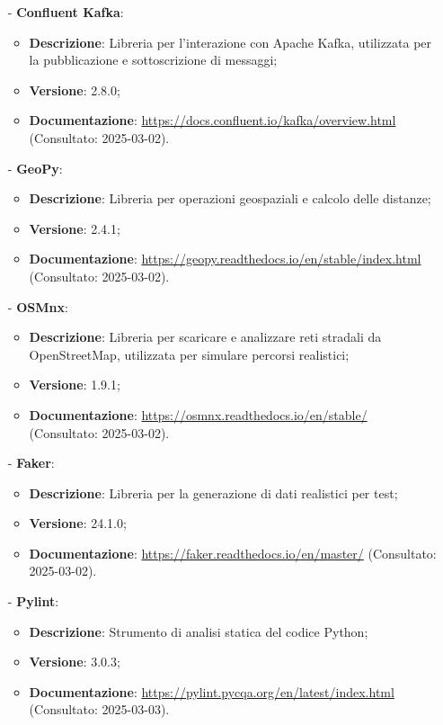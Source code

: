 \documentclass[10pt]{article}
\begin{document}
\begin{itemize}
    \item[-] \textbf{Confluent Kafka}:
    \begin{itemize}
        \item \textbf{Descrizione}: Libreria per l'interazione con Apache Kafka, utilizzata per la pubblicazione e sottoscrizione di messaggi;
        \item \textbf{Versione}: 2.8.0;
        \item \textbf{Documentazione}: \textcolor{blue}{\url{https://docs.confluent.io/kafka/overview.html}} (Consultato: 2025-03-02).
    \end{itemize}
    
    \item[-] \textbf{GeoPy}:
    \begin{itemize}
        \item \textbf{Descrizione}: Libreria per operazioni geospaziali e calcolo delle distanze;
        \item \textbf{Versione}: 2.4.1;
        \item \textbf{Documentazione}: \textcolor{blue}{\url{https://geopy.readthedocs.io/en/stable/index.html}} (Consultato: 2025-03-02).
    \end{itemize}
    
    \item[-] \textbf{OSMnx}:
    \begin{itemize}
        \item \textbf{Descrizione}: Libreria per scaricare e analizzare reti stradali da OpenStreetMap, utilizzata per simulare percorsi realistici;
        \item \textbf{Versione}: 1.9.1;
        \item \textbf{Documentazione}: \textcolor{blue}{\url{https://osmnx.readthedocs.io/en/stable/}} (Consultato: 2025-03-02).
    \end{itemize}
    
    \item[-] \textbf{Faker}:
    \begin{itemize}
        \item \textbf{Descrizione}: Libreria per la generazione di dati realistici per test;
        \item \textbf{Versione}: 24.1.0;
        \item \textbf{Documentazione}: \textcolor{blue}{\url{https://faker.readthedocs.io/en/master/}} (Consultato: 2025-03-02).
    \end{itemize}
    
    \item[-] \textbf{Pylint}:
    \begin{itemize}
        \item \textbf{Descrizione}: Strumento di analisi statica del codice Python;
        \item \textbf{Versione}: 3.0.3;
        \item \textbf{Documentazione}: \textcolor{blue}{\url{https://pylint.pycqa.org/en/latest/index.html}} (Consultato: 2025-03-03).
    \end{itemize}
    

\end{itemize}
\end{document}
